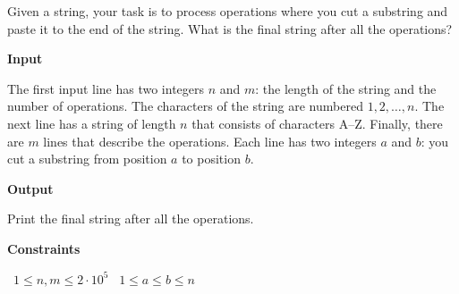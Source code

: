 Given a string, your task is to process operations where you cut a substring and paste it to the end of the string. What is the final string after all the operations?

\vspace{0.3cm}\noindent\textbf{Input}

The first input line has two integers $n$ and $m$: the length of the string and the number of operations. The characters of the string are numbered $1,2,\dots,n$.
The next line has a string of length $n$ that consists of characters A–Z.
Finally, there are $m$ lines that describe the operations. Each line has two integers $a$ and $b$: you cut a substring from position $a$ to position $b$.

\vspace{0.3cm}\noindent\textbf{Output}

Print the final string after all the operations.

\vspace{0.3cm}\noindent\textbf{Constraints}

\textbullet\ $1 \le n, m \le 2 \cdot 10^5$
\textbullet\ $1 \le a \le b \le n$